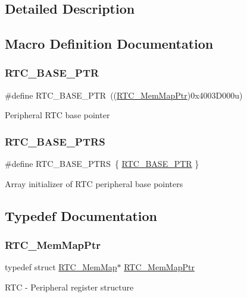 \subsection{Detailed Description}


\subsection{Macro Definition Documentation}
\mbox{\label{group___r_t_c___peripheral_ga6455e2b767b4b224b4f00b50e87a2441}} 
\subsubsection{\texorpdfstring{R\+T\+C\+\_\+\+B\+A\+S\+E\+\_\+\+P\+TR}{RTC\_BASE\_PTR}}
{\footnotesize\ttfamily \#define R\+T\+C\+\_\+\+B\+A\+S\+E\+\_\+\+P\+TR~((\hyperlink{group___r_t_c___peripheral_gac92da66fe1171e5751505df29917b152}{R\+T\+C\+\_\+\+Mem\+Map\+Ptr})0x4003\+D000u)}

Peripheral R\+TC base pointer \mbox{\label{group___r_t_c___peripheral_ga426dff8af34f3304d58b5bed5a54e583}} 
\subsubsection{\texorpdfstring{R\+T\+C\+\_\+\+B\+A\+S\+E\+\_\+\+P\+T\+RS}{RTC\_BASE\_PTRS}}
{\footnotesize\ttfamily \#define R\+T\+C\+\_\+\+B\+A\+S\+E\+\_\+\+P\+T\+RS~\{ \hyperlink{group___r_t_c___peripheral_ga6455e2b767b4b224b4f00b50e87a2441}{R\+T\+C\+\_\+\+B\+A\+S\+E\+\_\+\+P\+TR} \}}

Array initializer of R\+TC peripheral base pointers 

\subsection{Typedef Documentation}
\mbox{\label{group___r_t_c___peripheral_gac92da66fe1171e5751505df29917b152}} 
\subsubsection{\texorpdfstring{R\+T\+C\+\_\+\+Mem\+Map\+Ptr}{RTC\_MemMapPtr}}
{\footnotesize\ttfamily typedef struct \hyperlink{struct_r_t_c___mem_map}{R\+T\+C\+\_\+\+Mem\+Map}$\ast$ \hyperlink{group___r_t_c___peripheral_gac92da66fe1171e5751505df29917b152}{R\+T\+C\+\_\+\+Mem\+Map\+Ptr}}

R\+TC -\/ Peripheral register structure 